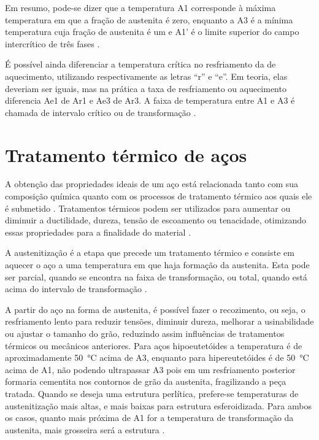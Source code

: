 \documentclass[brazil,tf,epusp]{usp}  %
\begin{document}
Em resumo, pode-se dizer que a temperatura A1 corresponde à máxima temperatura em que a fração de austenita é zero, enquanto a A3 é a mínima temperatura cuja fração de austenita é um e A1' é o limite superior do campo intercrítico de três fases \cite{Honeycombe1982}.

É possível ainda diferenciar a temperatura crítica no resfriamento da de aquecimento, utilizando respectivamente as letras ``r'' e ``e''. Em teoria, elas deveriam ser iguais, mas na prática a taxa de resfriamento ou aquecimento diferencia Ae1 de Ar1 e Ae3 de Ar3. A faixa de temperatura entre A1 e A3 é chamada de intervalo crítico ou de transformação \cite{Digges1960}.

\section{Tratamento térmico de aços}

A obtenção das propriedades ideais de um aço está relacionada tanto com sua composição química quanto com os processos de tratamento térmico aos quais ele é submetido \cite{Totten2006}. Tratamentos térmicos podem ser utilizados para aumentar ou diminuir a ductilidade, dureza, tensão de escoamento ou tenacidade, otimizando essas propriedades para a finalidade do material \cite{Silva2010}.

A austenitização é a etapa que precede um tratamento térmico e consiste em aquecer o aço a uma temperatura em que haja formação da austenita. Esta pode ser parcial, quando se encontra na faixa de transformação, ou total, quando está acima do intervalo de transformação \cite{ASM1991}.

A partir do aço na forma de austenita, é possível fazer o recozimento, ou seja, o resfriamento lento para reduzir tensões, diminuir dureza, melhorar a usinabilidade ou ajustar o tamanho do grão, reduzindo assim influências de tratamentos térmicos ou mecânicos anteriores. Para aços hipoeutetóides a temperatura é de aproximadamente \SI{50}{\celsius} acima de A3, enquanto para hipereutetóides é de \SI{50}{\celsius} acima de A1, não podendo ultrapassar A3 pois em um resfriamento posterior formaria cementita nos contornos de grão da austenita, fragilizando a peça tratada. Quando se deseja uma estrutura perlítica, prefere-se temperaturas de austenitização mais altas, e mais baixas para estrutura esferoidizada. Para ambos os casos, quanto mais próxima de A1 for a temperatura de transformação da austenita, mais grosseira será a estrutura .
\end{document}
